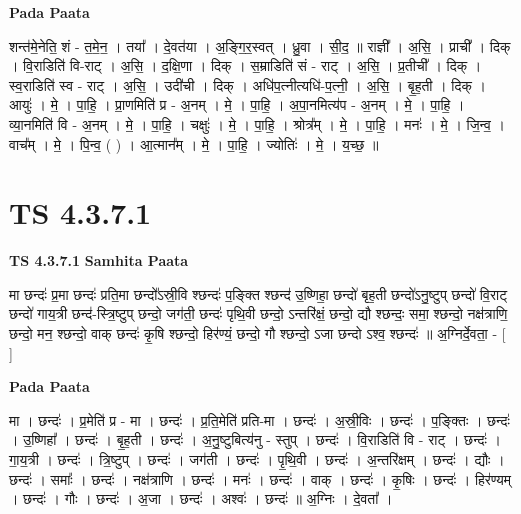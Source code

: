 \documentclass[17pt]{extarticle}
\begin{document}
\textbf{Pada Paata} \newline

शन्त॑मे॒नेति॒ शं - त॒मे॒न॒ । तया᳚ । दे॒वत॑या । अ॒ङ्गि॒र॒स्वत् । ध्रु॒वा । सी॒द॒ ॥ राज्ञी᳚ । अ॒सि॒ । प्राची᳚ । दिक् । वि॒राडिति॑ वि-राट् । अ॒सि॒ । द॒क्षि॒णा । दिक् । स॒म्राडिति॑ सं - राट् । अ॒सि॒ । प्र॒तीची᳚ । दिक् । स्व॒राडिति॑ स्व - राट् । अ॒सि॒ । उदी॑ची । दिक् । अधि॑प॒त्नीत्यधि॑-प॒त्नी॒ । अ॒सि॒ । बृ॒ह॒ती । दिक् । आयुः॑ । मे॒ । पा॒हि॒ । प्रा॒णमिति॑ प्र - अ॒नम् । मे॒ । पा॒हि॒ । अ॒पा॒नमित्य॑प - अ॒नम् । मे॒ । पा॒हि॒ । व्या॒नमिति॑ वि - अ॒नम् । मे॒ । पा॒हि॒ । चक्षुः॑ । मे॒ । पा॒हि॒ । श्रोत्र᳚म् । मे॒ । पा॒हि॒ । मनः॑ । मे॒ । जि॒न्व॒ । वाच᳚म् । मे॒ । पि॒न्व॒ ( ) । आ॒त्मान᳚म् । मे॒ । पा॒हि॒ । ज्योतिः॑ । मे॒ । य॒च्छ॒ ॥  \newline





\section{ TS 4.3.7.1 }

\textbf{TS 4.3.7.1 } \newline
\textbf{Samhita Paata} \newline

मा छन्दः॑ प्र॒मा छन्दः॑ प्रति॒मा छन्दो᳚ऽस्री॒वि श्छन्दः॑ प॒ङ्क्ति श्छन्द॑ उ॒ष्णिहा॒ छन्दो॑ बृह॒ती छन्दो॑ऽनु॒ष्टुप् छन्दो॑ वि॒राट् छन्दो॑ गाय॒त्री छन्द॑-स्त्रि॒ष्टुप् छन्दो॒ जग॑ती॒ छन्दः॑ पृथि॒वी छन्दो॒ ऽन्तरि॑क्षं॒ छन्दो॒ द्यौ श्छन्दः॒ समा॒ श्छन्दो॒ नक्ष॑त्राणि॒ छन्दो॒ मन॒ श्छन्दो॒ वाक् छन्दः॑ कृ॒षि श्छन्दो॒ हिर॑ण्यं॒ छन्दो॒ गौ श्छन्दो॒ ऽजा छन्दो ऽश्व॒ श्छन्दः॑ ॥ अ॒ग्निर्दे॒वता॒ - [  ] \newline

\textbf{Pada Paata} \newline

मा । छन्दः॑ । प्र॒मेति॑ प्र - मा । छन्दः॑ । प्र॒ति॒मेति॑ प्रति-मा । छन्दः॑ । अ॒स्री॒विः । छन्दः॑ । प॒ङ्क्तिः । छन्दः॑ । उ॒ष्णिहा᳚ । छन्दः॑ । बृ॒ह॒ती । छन्दः॑ । अ॒नु॒ष्टुबित्य॑नु - स्तुप् । छन्दः॑ । वि॒राडिति॑ वि - राट् । छन्दः॑ । गा॒य॒त्री । छन्दः॑ । त्रि॒ष्टुप् । छन्दः॑ । जग॑ती । छन्दः॑ । पृ॒थि॒वी । छन्दः॑ । अ॒न्तरि॑क्षम् । छन्दः॑ । द्यौः । छन्दः॑ । समाः᳚ । छन्दः॑ । नक्ष॑त्राणि । छन्दः॑ । मनः॑ । छन्दः॑ । वाक् । छन्दः॑ । कृ॒षिः । छन्दः॑ । हिर॑ण्यम् । छन्दः॑ । गौः । छन्दः॑ । अ॒जा । छन्दः॑ । अश्वः॑ । छन्दः॑ ॥ अ॒ग्निः । दे॒वता᳚ ।  \newline
\end{document}

